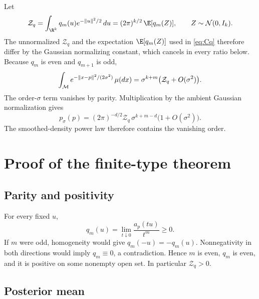 Let
\[
  \mathcal Z_q=\int_{\R^k}q_m(u)e^{-\|u\|^2/2}\,du
  =(2\pi)^{k/2}\,\E[q_m(Z)],\qquad Z\sim\cN(0,I_k).
\]
The unnormalized $\mathcal Z_q$ and the expectation $\E[q_m(Z)]$ used in
\eqref{eq:Cq} therefore differ by the Gaussian normalizing constant, which
cancels in every ratio below.  Because $q_m$ is even and $q_{m+1}$ is odd,
\begin{equation}
  \int_{\mathcal{M}} e^{-\|x-p\|^2/(2\sigma^2)}\,\mu(dx)
  =\sigma^{k+m}\bigl(\mathcal Z_q+O(\sigma^2)\bigr).
  \label{eq:normalizer-exp}
\end{equation}
The order-$\sigma$ term vanishes by parity.  Multiplication by the ambient Gaussian normalization gives
\begin{equation}
  p_\sigma(p)
  =(2\pi)^{-d/2}\mathcal Z_q\,
  \sigma^{k+m-d}\bigl(1+O(\sigma^2)\bigr).
  \label{eq:noisy-density-scaling}
\end{equation}
The smoothed-density power law therefore contains the vanishing order.

\section{Proof of the finite-type theorem}
\label{app:finite-proof}

\subsection{Parity and positivity}

For every fixed $u$,
\[
  q_m(u)=\lim_{t\downarrow0}\frac{a_p(tu)}{t^m}\ge0.
\]
If $m$ were odd, homogeneity would give $q_m(-u)=-q_m(u)$.  Nonnegativity in both directions would imply $q_m\equiv0$, a contradiction.  Hence $m$ is even, $q_m$ is even, and it is positive on some nonempty open set.  In particular $\mathcal Z_q>0$.

\subsection{Posterior mean}

